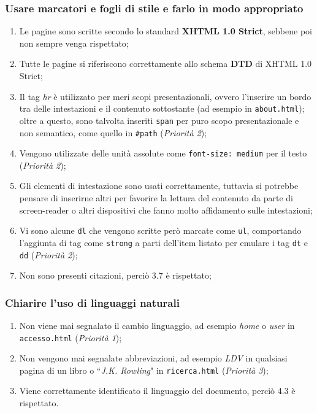 \subsubsection{Usare marcatori e fogli di stile e farlo in modo appropriato}
\begin{enumerate}
\item Le pagine sono scritte secondo lo standard \textbf{XHTML 1.0 Strict},
sebbene poi non sempre venga rispettato;
\item Tutte le pagine si riferiscono correttamente allo schema \textbf{DTD} di
XHTML 1.0 Strict;
\item Il tag \textit{hr} è utilizzato per meri scopi presentazionali, ovvero
l'inserire un bordo tra delle intestazioni e il contenuto sottostante (ad
esempio in \texttt{about.html}); oltre a questo, sono talvolta inseriti
\texttt{span} per puro scopo presentazionale e non semantico, come quello in
\texttt{\#path} (\textit{Priorità 2});
\item Vengono utilizzate delle unità assolute come \texttt{font-size: medium}
per il testo (\textit{Priorità 2});
\item Gli elementi di intestazione sono usati correttamente, tuttavia si
potrebbe pensare di inserirne altri per favorire la lettura del contenuto da
parte di screen-reader o altri dispositivi che fanno molto affidamento sulle
intestazioni;
\item Vi sono alcune \texttt{dl} che vengono scritte però marcate come
\texttt{ul}, comportando l'aggiunta di tag come \texttt{strong} a parti
dell'item listato per emulare i tag \texttt{dt} e \texttt{dd}
(\textit{Priorità 2});
\item Non sono presenti citazioni, perciò 3.7 è rispettato;
\end{enumerate}

\subsubsection{Chiarire l'uso di linguaggi naturali}
\begin{enumerate}
\item Non viene mai segnalato il cambio linguaggio, ad esempio \textit{home} o
\textit{user} in \texttt{accesso.html} (\textit{Priorità 1});
\item Non vengono mai segnalate abbreviazioni, ad esempio \textit{LDV} in
qualsiasi pagina di un libro o ``\textit{J.K. Rowling}" in
\texttt{ricerca.html} (\textit{Priorità 3});
\item Viene correttamente identificato il linguaggio del documento, perciò 4.3
è rispettato.
\end{enumerate}

